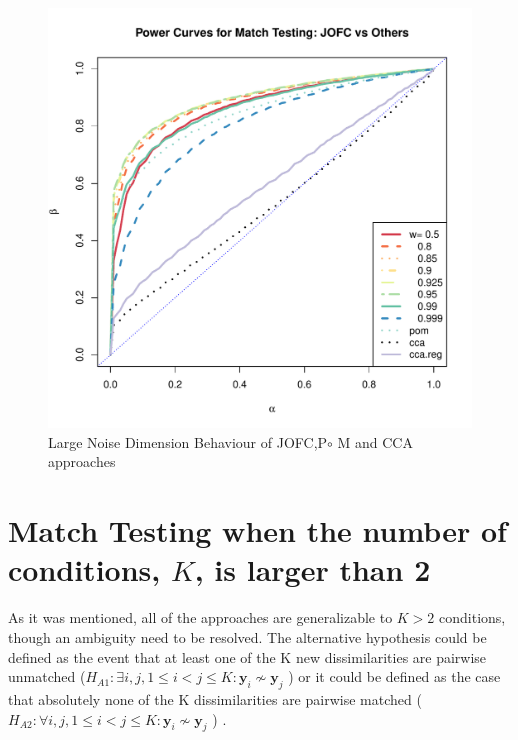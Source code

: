 \documentclass[12pt,oneside,final]{thesis}\usepackage[]{graphicx}\usepackage[]{color}
\begin{document}
\begin{figure}
\includegraphics[scale=0.8]{MVN_JOFC_q_90_c_0_001}
\caption{Large Noise Dimension Behaviour of JOFC,P$\circ$ M and CCA approaches}
\label{fig:largeq}
\end{figure}




\section{Match Testing when the number of conditions, $K$, is larger than 2\label{k_more_than_two_experiment}}


As it was mentioned, all of the approaches are generalizable to $K>2$ conditions, though an ambiguity need to be resolved. The alternative hypothesis could be  defined as the event that at least one of the K new dissimilarities are pairwise unmatched ($ H_{A1}: \exists i, j , 1\leq i < j \leq K :\bm{y}_{i} \nsim \bm{y}_{j} $ ) or it could be defined as the case that absolutely none of the K dissimilarities are pairwise matched   ($H_{A2}: \forall i, j , 1\leq i < j \leq K :\bm{y}_{i} \nsim \bm{y}_{j}$ )  .
\end{document}
